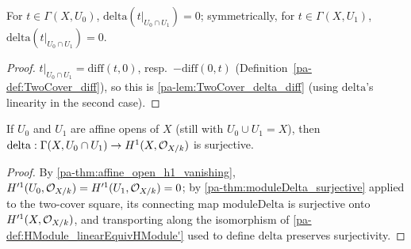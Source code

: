 \begin{lemma}
  \label{pa-lem:TwoCover_delta_resHom}
  \leanok

  For \(t \in \Gamma(X,U_0)\), \(\mathrm{delta}(t|_{U_0 \cap U_1}) = 0\); symmetrically, for
  \(t \in \Gamma(X,U_1)\), \(\mathrm{delta}(t|_{U_0 \cap U_1}) = 0\).
\end{lemma}
\begin{proof}
  \leanok
  \(t|_{U_0 \cap U_1} = \mathrm{diff}(t,0)\), resp.\ \(-\mathrm{diff}(0,t)\)
  (Definition~\ref{pa-def:TwoCover_diff}), so this is \ref{pa-lem:TwoCover_delta_diff} (using
  \(\mathrm{delta}\)'s linearity in the second case).
\end{proof}

\begin{theorem}
  \label{pa-thm:TwoCover_delta_surjective}
  \leanok

  If \(U_0\) and \(U_1\) are affine opens of \(X\) (still with \(U_0 \cup U_1 = X\)), then
  \(\mathrm{delta} : \Gamma(X, U_0 \cap U_1) \to H^1(X,\mathcal{O}_{X/k})\) is surjective.
\end{theorem}
\begin{proof}
  \leanok
  By \ref{pa-thm:affine_open_h1_vanishing}, \(H'^1(U_0,\mathcal{O}_{X/k}) = H'^1(U_1,\mathcal{O}_{X/k}) = 0\);
  by \ref{pa-thm:moduleDelta_surjective} applied to the two-cover square, its connecting map
  \(\mathrm{moduleDelta}\) is surjective onto \(H'^1(X,\mathcal{O}_{X/k})\), and transporting
  along the isomorphism of \ref{pa-def:HModule_linearEquivHModule'} used to define
  \(\mathrm{delta}\) preserves surjectivity.
\end{proof}

